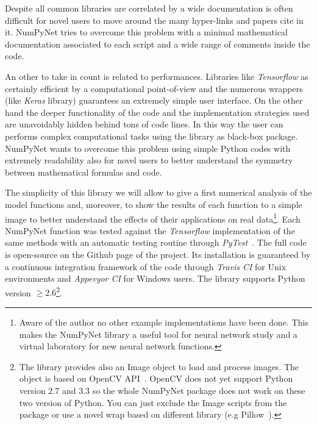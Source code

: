 \documentclass{standalone}
\begin{document}
Despite all common libraries are correlated by a wide documentation is often difficult for novel users to move around the many hyper-links and papers cite in it.
NumPyNet tries to overcome this problem with a minimal mathematical documentation associated to each script and a wide range of comments inside the code.

An other  to take in count is related to performances.
Libraries like \emph{Tensorflow} as certainly efficient by a computational point-of-view and the numerous wrappers (like \emph{Keras} library) guarantees an extremely simple user interface.
On the other hand the deeper functionality of the code and the implementation strategies used are unavoidably hidden behind tons of code lines.
In this way the user can performs complex computational tasks using the library as black-box package.
NumPyNet wants to overcome this problem using simple Python codes with extremely readability also for novel users to better understand the symmetry between mathematical formulas and code.

The simplicity of this library we will allow to give a first numerical analysis of the model functions and, moreover, to show the results of each function to a simple image to better understand the effects of their applications on real data\footnote{
  Aware of the author no other example implementations have been done.
  This makes the NumPyNet library a useful tool for neural network study and a virtual laboratory for new neural network functions.
}.
Each NumPyNet function was tested against the \emph{Tensorflow} implementation of the same methods with an automatic testing routine through \emph{PyTest}~\cite{PyTest}.
The full code is open-source on the Github page of the project.
Its installation is guaranteed by a continuous integration framework of the code through \emph{Travis CI} for Unix environments and \emph{Appevyor CI} for Windows users.
The library supports Python version $\ge2.6$\footnote{
  The library provides also an \textsf{Image} object to load and process images.
  The object is based on OpenCV API~\cite{OpenCV}.
  OpenCV does not yet support Python version 2.7 and 3.3 so the whole NumPyNet package does not work on these two version of Python.
  You can just exclude the \textsf{Image} scripts from the package or use a novel wrap based on different library (e.g \textsf{Pillow}~\cite{Pillow}).
}.
\end{document}
